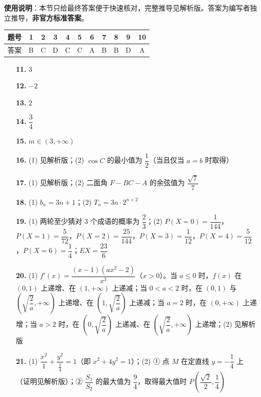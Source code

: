 
\begin{gknotice}
\textbf{使用说明}：本节只给最终答案便于快速核对，完整推导见解析版。答案为编写者独立推导，\textbf{非官方标准答案}。
\end{gknotice}

\begin{center}\begin{tabular}{ccccccccccc}
\toprule
题号 & 1 & 2 & 3 & 4 & 5 & 6 & 7 & 8 & 9 & 10 \\
\midrule
答案 & B & C & D & C & C & A & B & B & D & A \\
\bottomrule
\end{tabular}\end{center}

\begin{itemize}[leftmargin=2.6em]
  \item[\textbf{11.}] \(3\)
  \item[\textbf{12.}] \(-2\)
  \item[\textbf{13.}] \(2\)
  \item[\textbf{14.}] \(\dfrac{3}{4}\)
  \item[\textbf{15.}] \(m\in(3,+\infty)\)
\end{itemize}

\begin{itemize}[leftmargin=2.6em]
  \item[\textbf{16.}] (1) 见解析版；(2) \(\cos C\) 的最小值为 \(\dfrac{1}{2}\)（当且仅当 \(a=b\) 时取得）
  \item[\textbf{17.}] (1) 见解析版；(2) 二面角 \(F-BC-A\) 的余弦值为 \(\dfrac{\sqrt{7}}{7}\)
  \item[\textbf{18.}] (1) \(b_{n}=3n+1\)；(2) \(T_{n}=3n\cdot 2^{n+2}\)
  \item[\textbf{19.}] (1) 两轮至少猜对 \(3\) 个成语的概率为 \(\dfrac{2}{3}\)；(2) \(P(X=0)=\dfrac{1}{144}\)，\(P(X=1)=\dfrac{5}{72}\)，\(P(X=2)=\dfrac{25}{144}\)，\(P(X=3)=\dfrac{1}{12}\)，\(P(X=4)=\dfrac{5}{12}\)，\(P(X=6)=\dfrac{1}{4}\)；\(EX=\dfrac{23}{6}\)
  \item[\textbf{20.}] (1) \(f'(x)=\dfrac{(x-1)(ax^{2}-2)}{x^{3}}\)（\(x>0\)）。当 \(a\leqslant 0\) 时，\(f(x)\) 在 \((0,1)\) 上递增、在 \((1,+\infty)\) 上递减；当 \(0<a<2\) 时，在 \((0,1)\) 与 \(\left(\sqrt{\dfrac{2}{a}},+\infty\right)\) 上递增、在 \(\left(1,\sqrt{\dfrac{2}{a}}\right)\) 上递减；当 \(a=2\) 时，在 \((0,+\infty)\) 上递增；当 \(a>2\) 时，在 \(\left(0,\sqrt{\dfrac{2}{a}}\right)\) 上递减、在 \(\left(\sqrt{\dfrac{2}{a}},+\infty\right)\) 上递增；(2) 见解析版
  \item[\textbf{21.}] (1) \(\dfrac{x^{2}}{1}+\dfrac{y^{2}}{\frac{1}{4}}=1\)（即 \(x^{2}+4y^{2}=1\)）；(2) ① 点 \(M\) 在定直线 \(y=-\dfrac{1}{4}\) 上（证明见解析版）；② \(\dfrac{S_{1}}{S_{2}}\) 的最大值为 \(\dfrac{9}{4}\)，取得最大值时 \(P\left(\dfrac{\sqrt{2}}{2},\dfrac{1}{4}\right)\)
\end{itemize}

